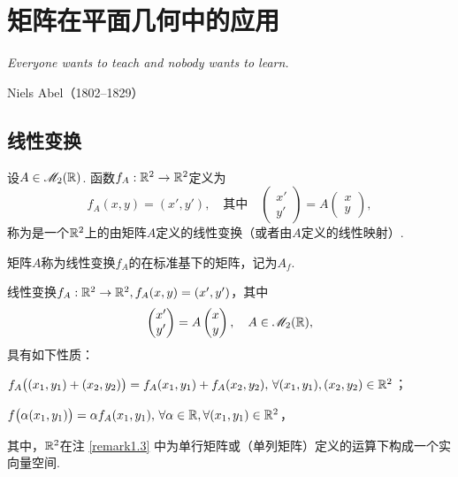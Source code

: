 \chapter{矩阵在平面几何中的应用}
\begin{proverb}
  { \itshape
   Everyone wants to teach and nobody wants to learn.
  }

\hfill Niels Abel（1802--1829）
\end{proverb}


\section{线性变换}
\begin{definition}
  设$A\in\mathscr M_2(\mathbb R)$. 函数$f_A:\mathbb R^2\to\mathbb R^2$定义为
  \[
    f_A(x,y) = (x',y'),\quad \text{其中}\quad
    \begin{pmatrix}
      x' \\ y'
    \end{pmatrix} = A \begin{pmatrix}
      x \\ y
    \end{pmatrix},
  \]
  称为是一个$\mathbb R^2$上的由矩阵$A$定义的{\kaishu 线性变换}（或者由$A$定义的{\kaishu 线性映射}）.

  矩阵$A$称为线性变换$f_A$的在标准基下的矩阵，记为$A_f$.
\end{definition}

\begin{prop}
  线性变换$f_A:\mathbb R^2\to\mathbb R^2,f_A(x,y)=(x',y')$，其中
  \[
    \begin{pmatrix}
      x' \\ y'
    \end{pmatrix} = A \begin{pmatrix}
      x \\ y
    \end{pmatrix}, \quad A\in \mathscr M_2(\mathbb R),
  \]
  具有如下性质：
  \begin{enum}
    \item\label{prop5.1a} $f_A\big( (x_1,y_1) + (x_2,y_2) \big)
    =f_A(x_1,y_1)+f_A(x_2,y_2),\,\forall (x_1,y_1),(x_2,y_2)\in\mathbb R^2$；
    \item\label{prop5.1b} $f\big(\alpha(x_1,y_1)\big)=\alpha f_A(x_1,y_1),\,\forall\alpha\in\mathbb R,\forall (x_1,y_1)\in\mathbb R^2$，
  \end{enum}
  其中，$\mathbb R^2$在注 \ref{remark1.3} 中为单行矩阵或（单列矩阵）定义的运算下构成一个实向量空间.
\end{prop}

